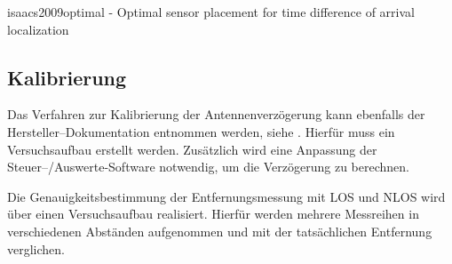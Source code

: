 isaacs2009optimal - Optimal sensor placement for time difference of arrival localization


\begin{comment}
------------------------------------------------------------------------------------------
\end{comment}
\subsection{Kalibrierung}

\begin{comment}
- Kalibierungsalgorithmus nach decaWave
	- Hab ich den Überhaupt richtig implementiert?
- Kalibierung über die Anpassung der einer Antennen Delay für alle.
- Kann über die Kalibrierung der Antennenverzögerung eine genauere Entfernungsmessung erreicht werden?
\end{comment}


Das Verfahren zur Kalibrierung der Antennenverzögerung kann ebenfalls der Hersteller--Dokumentation entnommen werden, siehe \cite{decawave2014calibration}. Hierfür muss ein Versuchsaufbau erstellt werden. Zusätzlich wird eine Anpassung der Steuer--/Auswerte-Software notwendig, um die Verzögerung zu berechnen.

Die Genauigkeitsbestimmung der Entfernungsmessung mit LOS und NLOS wird über einen Versuchsaufbau realisiert. Hierfür werden mehrere Messreihen in verschiedenen Abständen aufgenommen und mit der tatsächlichen Entfernung verglichen.